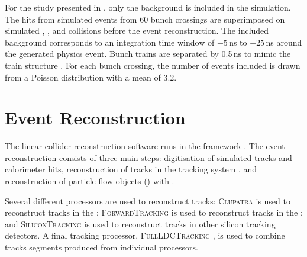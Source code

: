 
For the study presented in , only the \ggHad background is included in the simulation. The hits from simulated \ggHad events from 60 bunch crossings are superimposed on simulated \ee, \Egamma, and \Gammagamma collisions before the event reconstruction. The included background corresponds to an integration time window of $-5$\,ns to $+25$\,ns around the generated physics event. Bunch trains are separated by 0.5\,ns to mimic the \CLIC train structure \cite{Linssen:2012hp}. For each bunch crossing, the number of \ggHad events included is drawn from a Poisson distribution with a mean of 3.2.






\section{Event Reconstruction}

The linear collider reconstruction software runs in the \Marlin framework \cite{Gaede:2006pj}. The event reconstruction consists of three main steps: digitisation of simulated tracks and calorimeter hits, reconstruction of tracks in the tracking system \cite{Gaede:2014aza}, and reconstruction of particle flow objects (\PFOs) with \pandora\cite{Thomson:2009rp,Marshall:2012ry}.


Several different \Marlin processors are used to reconstruct tracks: \textsc{Clupatra} \cite{Gaede:2014aza} is used to reconstruct tracks in the \TPC; \textsc{ForwardTracking} \cite{Gaede:2014aza} is used to reconstruct tracks in the \FTD; and \textsc{SiliconTracking} \cite{Gaede:2014aza} is used to reconstruct tracks in other silicon tracking detectors. A final \Marlin tracking processor, \textsc{FullLDCTracking} \cite{Gaede:2014aza}, is used to combine tracks segments produced from individual processors.

